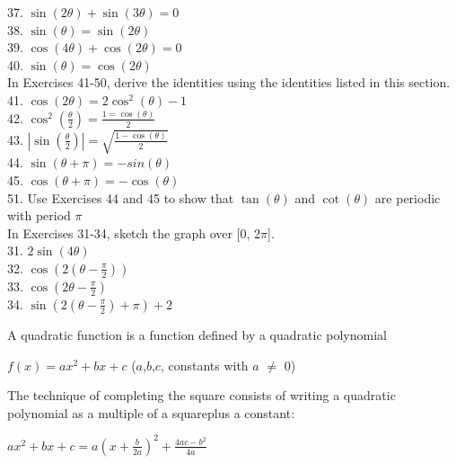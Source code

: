 \documentclass{article}
\begin{document}
37. $\sin(2\theta) + \sin(3\theta) = 0$\\

38. $\sin(\theta) = \sin(2\theta)$\\

39. $\cos(4\theta) + \cos(2\theta) = 0$\\

40. $\sin(\theta) = \cos(2\theta)$\\

In Exercises 41-50, derive the identities using the identities listed in this section.\\

41. $\cos(2\theta) = 2\cos^2(\theta) - 1$\\

42. $\cos^2(\frac{\theta}{2}) = \frac{1 = \cos(\theta)}{2}$\\

43. $\left|\sin(\frac{\theta}{2})\right| = \sqrt{\frac{1 - \cos(\theta)}{2}}$\\

44. $\sin(\theta + \pi) = -sin(\theta)$\\

45. $\cos(\theta + \pi) = -\cos(\theta)$\\

51. Use Exercises 44 and 45 to show that $\tan(\theta)$ and $\cot(\theta)$ are periodic with period $\pi$\\

In Exercises 31-34, sketch the graph over [0, 2$\pi$].\\

31. $2\sin(4\theta)$\\

32. $\cos(2(\theta - \frac{\pi}{2}))$\\

33. $\cos(2\theta - \frac{\pi}{2})$\\

34. $\sin(2(\theta - \frac{\pi}{2}) + \pi) + 2$\\

\newpage

A quadratic function is a function defined by a quadratic polynomial\\
\begin{center}$f(x) = ax^2 + bx + c$ ($a$,$b$,$c$, constants with $a$ $\neq$ 0)\\\end{center}

The technique of completing the square consists of writing a quadratic polynomial as a multiple of a squareplus a constant:\\
\begin{center}$ax^2 + bx + c = a(x + \frac{b}{2a})^2 + \frac{4ac-b^2}{4a}$\\\end{center}
\end{document}
